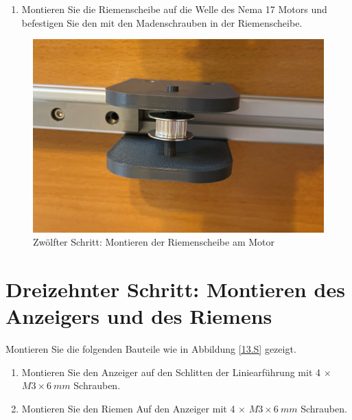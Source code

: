 \begin{enumerate}
	\item Montieren Sie die Riemenscheibe auf die Welle des Nema 17 Motors und befestigen Sie den mit den Madenschrauben in der Riemenscheibe. 
\end{enumerate}

\begin{figure}[H]
	\begin{center}
		\includegraphics[width=\textwidth]{Images/11Schr.jpg}
		\caption{Zwölfter Schritt: Montieren der Riemenscheibe am Motor} \label{12.S}
	\end{center}
\end{figure}


\section{Dreizehnter Schritt: Montieren des Anzeigers und des Riemens}
Montieren Sie die folgenden Bauteile wie in Abbildung \ref{13.S} gezeigt.

\begin{enumerate}
	\item Montieren Sie den Anzeiger auf den Schlitten der Liniearführung mit 4 $\times$ $ M3 \times 6 \ mm $ Schrauben.
	\item Montieren Sie den Riemen Auf den Anzeiger mit 4 $\times$ $ M3 \times 6 \ mm $ Schrauben.
\end{enumerate}

